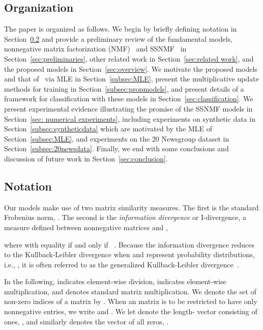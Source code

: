 \documentclass[twocolumn,10pt]{article}
\begin{document}
\subsection{Organization}\label{sec:organization}
The paper is organized as follows.  We begin by briefly defining 
notation in Section~\ref{sec:notation} and provide a preliminary review of the fundamental models, nonnegative matrix factorization (NMF)~\cite{lee1999learning} and SSNMF~\cite{lee2009semi} in Section~\ref{sec:preliminaries}, other related work in Section~\ref{sec:related work}, and 
the proposed models in Section~\ref{sec:overview}.  
We motivate the proposed models and that of~\cite{lee2009semi} via MLE in Section~\ref{subsec:MLE}, present the multiplicative update methods for training in Section~\ref{subsec:propmodels}, and present details of a framework for classification with these models in Section~\ref{sec:classification}. We present experimental evidence illustrating the promise of the SSNMF models in Section~\ref{sec: numerical experiments},  
including experiments on synthetic data in Section~\ref{subsec:syntheticdata} which are motivated by the MLE of Section~\ref{subsec:MLE}, and experiments on the 20 Newsgroup dataset in Section~\ref{subsec:20newsdata}.  Finally, we end with some conclusions and discussion of future work in Section~\ref{sec:conclusion}.

\subsection{Notation}\label{sec:notation}
Our models make use of two matrix similarity measures.  The first is the standard Frobenius norm, . 
The second is the \emph{information divergence} or I-divergence, a measure defined between nonnegative matrices  and ,

where  with equality if and only if ~\cite{lee2001algorithms}.
Because the information divergence reduces to the Kullback-Leibler divergence when  and  represent probability distributions, i.e., , it is often referred to as the generalized Kullback-Leibler divergence~\cite{favaro20073}.
 
In the following,  indicates element-wise division,  indicates element-wise multiplication, and  denotes standard matrix multiplication.  We denote the set of non-zero indices of a matrix by .  When an  matrix is to be restricted to have only nonnegative entries, we write  and . We let  denote the length- vector consisting of ones, , and similarly  denotes the vector of all zeros, .
\end{document}
